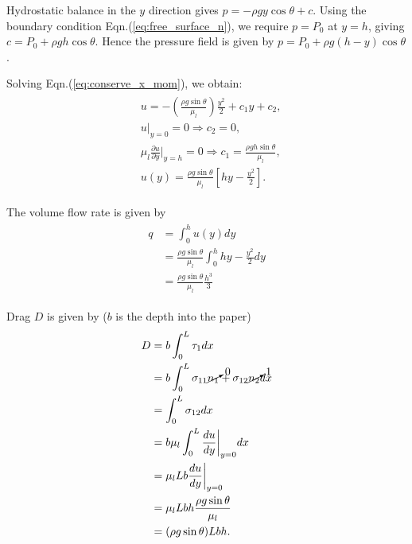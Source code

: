 \documentclass{article}
\begin{document}
Hydrostatic balance in the $y$ direction gives $p = -\rho g y \cos{\theta} + c$. Using the boundary condition Eqn.(\ref{eq:free_surface_n}), we require $p  = P_{0}$ at $y = h$, giving $ c = P_{0} + \rho g h \cos{\theta}$. Hence the pressure field is given by $\boxed{p = P_{0} + \rho g (h-y) \cos{\theta}}$.

Solving Eqn.(\ref{eq:conserve_x_mom}), we obtain: 
\begin{align}
 \begin{split}
  & u = -\left(\frac{\rho g \sin{\theta}}{\mu_{l}} \right)  \frac{y^{2}}{2} + c_{1} y + c_{2},\\
 & u|_{y=0} = 0 \Rightarrow c_{2} = 0, \\
 & \mu_{l}\frac{\partial u}{\partial y}\bigg|_{y = h} = 0 \Rightarrow c_{1} = \frac{\rho g h \sin{\theta}}{\mu_{l}},\\
 & \boxed{ u(y) = \frac{\rho g \sin{\theta}}{\mu_{l}} \left[hy - \frac{y^{2}}{2} \right]}.
 \end{split}
\end{align}

The volume flow rate is given by
\begin{align}
 \begin{split}
  q &= \int_{0}^{h} u(y) dy \\
  &= \frac{\rho g \sin{\theta}}{\mu_{l}} \int_{0}^{h} hy - \frac{y^{2}}{2} dy \\
  &=  \frac{\rho g \sin{\theta}}{\mu_{l}} \frac{h^{3}}{3}
 \end{split}
\end{align}

Drag $D$ is given by ($b$ is the depth into the paper)
\begin{align}
 \begin{split}
  D &= b\int_{0}^{L} \tau_{1} dx\\
  &= b\int_{0}^{L} \sigma_{11} \cancelto{0}{n_{1}} + \sigma_{12} \cancelto{1}{n_{2}} dx \\
  & = \int_{0}^{L} \sigma_{12} dx \\
  & = b \mu_{l} \int_{0}^{L} \frac{d u}{d y}\bigg|_{y=0} dx \\
  & = \mu_{l}Lb\frac{d u}{d y}\bigg|_{y=0} \\
  & = \mu_{l}Lbh \frac{\rho g \sin{\theta}}{\mu_{l}} \\
  & = (\rho g \sin{\theta}) Lbh.
 \end{split}
\end{align}



 \if@openright\cleardoublepage\else\clearpage\fi
 \cleardoublepage
 \pagestyle{empty}
\end{document}
